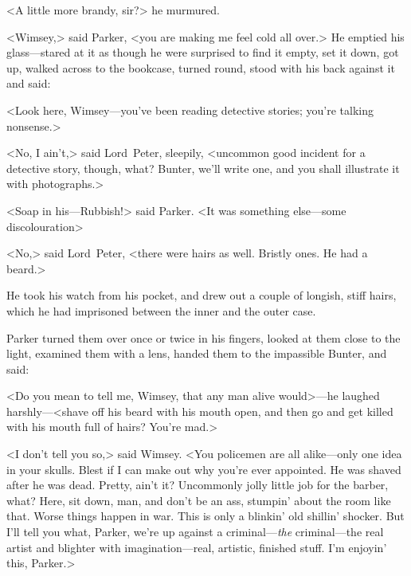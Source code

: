 <A little more brandy, sir?> he murmured.

<Wimsey,> said Parker, <you are making me feel cold all over.> He emptied his glass—stared at it as though he were surprised to find it empty, set it down, got up, walked across to the bookcase, turned round, stood with his back against it and said:

<Look here, Wimsey—you've been reading detective stories; you're talking nonsense.>

<No, I ain't,> said Lord~Peter, sleepily, <uncommon good incident for a detective story, though, what? Bunter, we'll write one, and you shall illustrate it with photographs.>

<Soap in his—Rubbish!> said Parker. <It was something else—some discolouration\longdash>

<No,> said Lord~Peter, <there were hairs as well. Bristly ones. He had a beard.>

He took his watch from his pocket, and drew out a couple of longish, stiff hairs, which he had imprisoned between the inner and the outer case.

Parker turned them over once or twice in his fingers, looked at them close to the light, examined them with a lens, handed them to the impassible Bunter, and said:

<Do you mean to tell me, Wimsey, that any man alive would>—he laughed harshly—<shave off his beard with his mouth open, and then go and get killed with his mouth full of hairs? You're mad.>

<I don't tell you so,> said Wimsey. <You policemen are all alike—only one idea in your skulls. Blest if I can make out why you're ever appointed. He was shaved after he was dead. Pretty, ain't it? Uncommonly jolly little job for the barber, what? Here, sit down, man, and don't be an ass, stumpin' about the room like that. Worse things happen in war. This is only a blinkin' old shillin' shocker. But I'll tell you what, Parker, we're up against a criminal—\emph{the} criminal—the real artist and blighter with imagination—real, artistic, finished stuff. I'm enjoyin' this, Parker.>